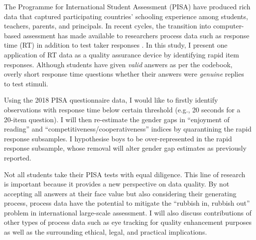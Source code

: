 The Programme for International Student Assessment (PISA) have produced rich data that captured participating countries' schooling experience among students, teachers, parents, and principals. In recent cycles, the transition into computer-based assessment has made available to researchers process data such as response time (RT) in addition to test taker responses \parencite{oced:2020a}. In this study, I present one application of RT data as a quality assurance device by identifying rapid item responses. Although students have given \emph{valid} answers as per the codebook, overly short response time questions whether their answers were \emph{genuine} replies to test stimuli.

Using the 2018 PISA questionnaire data, I would like to firstly identify observations with response time below certain threshold (e.g., 20 seconds for a 20-item question). I will then re-estimate the gender gaps in ``enjoyment of reading'' and ``competitiveness/cooperativeness'' indices \parencite{oced:2020b} by quarantining the rapid response subsamples. I hypothesise boys to be over-represented in the rapid response subsample, whose removal will alter gender gap estimates as previously reported.

Not all students take their PISA tests with equal diligence. This line of research is important because it provides a new perspective on data quality. By not accepting all answers at their face value but also considering their generating process, process data have the potential to mitigate the ``rubbish in, rubbish out'' problem in international large-scale assessment. I will also discuss contributions of other types of process data such as eye tracking for quality enhancement purposes as well as the surrounding ethical, legal, and practical implications.
